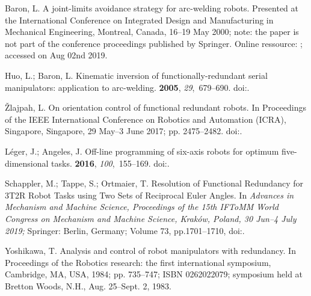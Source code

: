 \documentclass[robotics,article,accept,moreauthors,pdftex]{Definitions/mdpi}
\begin{document}
\begin{thebibliography}{999}
{Baron, L.
\newblock A joint-limits avoidance strategy for arc-welding robots.
\newblock  Presented at the International Conference on Integrated Design and Manufacturing in Mechanical Engineering, Montreal, Canada, 16--19 May  2000; note: the paper is not part of the conference proceedings published by Springer. Online ressource: {\href{https://www.researchgate.net/profile/Luc_Baron}{}}; accessed on Aug 02nd 2019.}

Huo, L.; Baron, L.
\newblock Kinematic inversion of functionally-redundant serial manipulators:
  application to arc-welding.
  {\bf 2005}, {\em 29},~679--690.
\newblock
  doi:{\href{https://doi.org/10.1139/tcsme-2005-0045}{}}.

Žlajpah, L.
\newblock On orientation control of functional redundant robots.
\newblock  In Proceedings of the IEEE International Conference on Robotics and Automation (ICRA), Singapore, Singapore, 29 May--3 June 2017; pp. 2475--2482.
\newblock
  doi:{\href{https://doi.org/10.1109/ICRA.2017.7989288}{}}.

Léger, J.; Angeles, J.
\newblock Off-line programming of six-axis robots for optimum five-dimensional
  tasks.
 {\bf 2016}, {\em 100},~155--169.
\newblock
  doi:{\href{https://doi.org/10.1016/j.mechmachtheory.2016.01.015}{}}.

Schappler, M.; Tappe, S.; Ortmaier, T.
\newblock Resolution of Functional Redundancy for 3T2R Robot Tasks using Two
  Sets of Reciprocal Euler Angles.
\newblock  In \emph{Advances in Mechanism and Machine Science, Proceedings of  the 15th IFToMM World Congress on Mechanism and Machine Science, Kraków, Poland, 30 Jun--4 July 2019;} Springer: Berlin, Germany; Volume 73, pp.1701--1710,
\newblock 
  doi:{\href{https://doi.org/10.1007/978-3-030-20131-9_168}{}}.

Yoshikawa, T.
\newblock Analysis and control of robot manipulators with redundancy.
\newblock  In Proceedings of the Robotics research: the first international symposium, Cambridge, MA, USA, 1984; pp. 735--747; ISBN 0262022079; symposium held at Bretton Woods, N.H., Aug. 25--Sept. 2, 1983.


\end{thebibliography}
\end{document}
